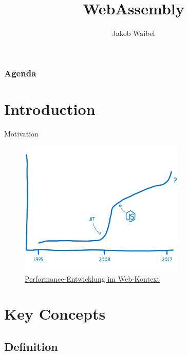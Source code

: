 \documentclass{beamer}
\title[WebAssembly]{WebAssembly}
\author{Jakob Waibel}
\institute[Jakob Waibel]{MI7 Druck und Medien}
\date
\begin{document}
\begin{frame}
    \titlepage
\end{frame}

\begin{frame}
    \frametitle{Agenda}
    \begin{multicols}{2}
    \tableofcontents
    \end{multicols}
\end{frame}

\section{Introduction}

\begin{frame}{Motivation}
    \begin{figure}
        \includegraphics[width=0.7\textwidth,height=0.7\textheight]{./images/perf_history.png}
        \caption{\href{https://hacks.mozilla.org/2017/02/a-cartoon-intro-to-webassembly/}{Performance-Entwicklung im Web-Kontext}}
    \end{figure}
\end{frame}

\section{Key Concepts}

\subsection{Definition}
\end{document}
